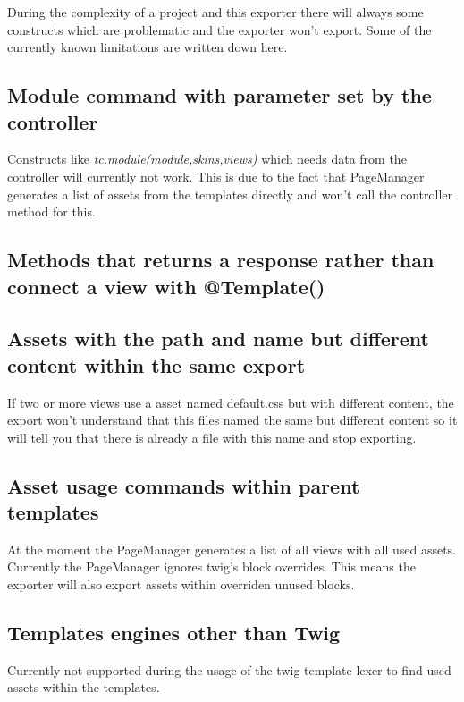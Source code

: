 During the complexity of a project and this exporter there will always some constructs which are problematic and the exporter won't export. Some of the currently known limitations are written down here.

\subsection{Module command with parameter set by the controller}
Constructs like \emph{tc.module(module,skins,views)} which needs data from the controller will currently not work. This is due to the fact that PageManager generates a list of assets from the templates directly and won't call the controller method for this.

\subsection{Methods that returns a response rather than connect a view with @Template()}

\subsection{Assets with the path and name but different content within the same export}
If two or more views use a asset named default.css but with different content, the export won't understand that this files named the same but different content so it will tell you that there is already a file with this name and stop exporting.

\subsection{Asset usage commands within parent templates}
At the moment the PageManager generates a list of all views with all used assets. Currently the PageManager ignores twig's block overrides. This means the exporter will also export assets within overriden unused blocks.

\subsection{Templates engines other than Twig}
Currently not supported during the usage of the twig template lexer to find used assets within the templates.